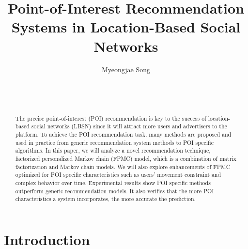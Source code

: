 \documentclass{sig-alternate}
\begin{document}

\title{Point-of-Interest Recommendation Systems in Location-Based Social Networks}


\author{
\alignauthor
Myeongjae Song\\
	\\
	\\
	\\
}

\maketitle
\begin{abstract}
The precise point-of-interest (POI) recommendation is key to the success of 
location-based social networks (LBSN) since it will attract more users and advertisers 
to the platform. To achieve the POI recommendation task, many methods are proposed 
and used in practice from generic recommendation system methods to POI specific 
algorithms. In this paper, we will analyze a novel recommendation technique, 
factorized personalized Markov chain (FPMC) model, which is a combination of matrix 
factorization and Markov chain models. We will also explore enhancements of FPMC 
optimized for POI specific characteristics such as users' movement constraint and 
complex behavior over time. Experimental results show POI specific methods outperform 
generic recommendation models. It also verifies that the more POI characteristics a system incorporates, 
the more accurate the prediction.
\end{abstract}



\section{Introduction}
\label{sec:introduction}
\end{document}
